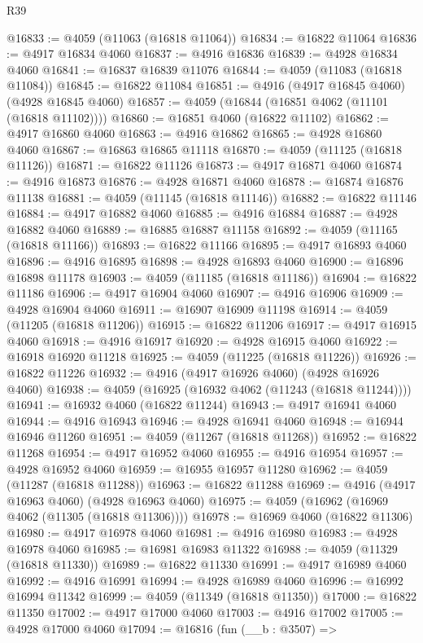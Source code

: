 \begin{lexlean}{R39}
\begin{coremodule}
@16833 := @4059 (@11063 (@16818 @11064))
@16834 := @16822 @11064
@16836 := @4917 @16834 @4060
@16837 := @4916 @16836
@16839 := @4928 @16834 @4060
@16841 := @16837 @16839 @11076
@16844 := @4059 (@11083 (@16818 @11084))
@16845 := @16822 @11084
@16851 := @4916 (@4917 @16845 @4060) (@4928 @16845 @4060)
@16857 := @4059 (@16844 (@16851 @4062 (@11101 (@16818 @11102))))
@16860 := @16851 @4060 (@16822 @11102)
@16862 := @4917 @16860 @4060
@16863 := @4916 @16862
@16865 := @4928 @16860 @4060
@16867 := @16863 @16865 @11118
@16870 := @4059 (@11125 (@16818 @11126))
@16871 := @16822 @11126
@16873 := @4917 @16871 @4060
@16874 := @4916 @16873
@16876 := @4928 @16871 @4060
@16878 := @16874 @16876 @11138
@16881 := @4059 (@11145 (@16818 @11146))
@16882 := @16822 @11146
@16884 := @4917 @16882 @4060
@16885 := @4916 @16884
@16887 := @4928 @16882 @4060
@16889 := @16885 @16887 @11158
@16892 := @4059 (@11165 (@16818 @11166))
@16893 := @16822 @11166
@16895 := @4917 @16893 @4060
@16896 := @4916 @16895
@16898 := @4928 @16893 @4060
@16900 := @16896 @16898 @11178
@16903 := @4059 (@11185 (@16818 @11186))
@16904 := @16822 @11186
@16906 := @4917 @16904 @4060
@16907 := @4916 @16906
@16909 := @4928 @16904 @4060
@16911 := @16907 @16909 @11198
@16914 := @4059 (@11205 (@16818 @11206))
@16915 := @16822 @11206
@16917 := @4917 @16915 @4060
@16918 := @4916 @16917
@16920 := @4928 @16915 @4060
@16922 := @16918 @16920 @11218
@16925 := @4059 (@11225 (@16818 @11226))
@16926 := @16822 @11226
@16932 := @4916 (@4917 @16926 @4060) (@4928 @16926 @4060)
@16938 := @4059 (@16925 (@16932 @4062 (@11243 (@16818 @11244))))
@16941 := @16932 @4060 (@16822 @11244)
@16943 := @4917 @16941 @4060
@16944 := @4916 @16943
@16946 := @4928 @16941 @4060
@16948 := @16944 @16946 @11260
@16951 := @4059 (@11267 (@16818 @11268))
@16952 := @16822 @11268
@16954 := @4917 @16952 @4060
@16955 := @4916 @16954
@16957 := @4928 @16952 @4060
@16959 := @16955 @16957 @11280
@16962 := @4059 (@11287 (@16818 @11288))
@16963 := @16822 @11288
@16969 := @4916 (@4917 @16963 @4060) (@4928 @16963 @4060)
@16975 := @4059 (@16962 (@16969 @4062 (@11305 (@16818 @11306))))
@16978 := @16969 @4060 (@16822 @11306)
@16980 := @4917 @16978 @4060
@16981 := @4916 @16980
@16983 := @4928 @16978 @4060
@16985 := @16981 @16983 @11322
@16988 := @4059 (@11329 (@16818 @11330))
@16989 := @16822 @11330
@16991 := @4917 @16989 @4060
@16992 := @4916 @16991
@16994 := @4928 @16989 @4060
@16996 := @16992 @16994 @11342
@16999 := @4059 (@11349 (@16818 @11350))
@17000 := @16822 @11350
@17002 := @4917 @17000 @4060
@17003 := @4916 @17002
@17005 := @4928 @17000 @4060
@17094 := @16816
    (fun (__b : @3507) =>

\end{coremodule}
\end{lexlean}
